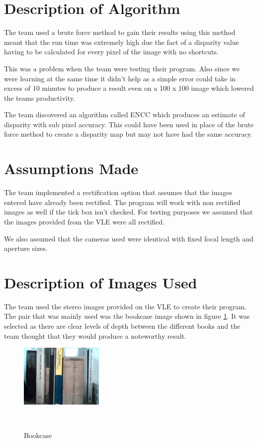 \documentclass[twocolumn]{article}
\begin{document}
\section{Description of Algorithm}
\vspace{-1ex}

The team used a brute force method to gain their results using this method meant that the run time was extremely high due the fact of a disparity value having to be calculated for every pixel of the image with no shortcuts. 

This was a problem when the team were testing their program. Also since we were learning at the same time it didn't help as a simple error could take in excess of 10 minutes to produce a result even on a 100 x 100 image which lowered the teams productivity. 

The team discovered an algorithm called ENCC \cite{ENCC} which produces an estimate of disparity with sub pixel accuracy. This could have been used in place of the brute force method to create a disparity map but may not have had the same accuracy. 

\section{Assumptions Made}
\vspace{-1ex}

The team implemented a rectification option that assumes that the images entered have already been rectified. The program will work with non rectified images as well if the tick box isn't checked. For testing purposes we assumed that the images provided from the VLE were all rectified.  

We also assumed that the cameras used were identical with fixed focal length and aperture sizes.

\section{Description of Images Used}

The team used the stereo images provided on the VLE to create their program. The pair that was mainly used was the bookcase image shown in figure \ref{fig:testR}. It was selected as there are clear levels of depth between the different books and the team thought that they would produce a noteworthy result. 

\begin{figure}[H]
\centering
  \includegraphics[width=40mm]{Figures/testR}
    \caption{Bookcase}~\label{fig:testR}
\end{figure} 
\end{document}
